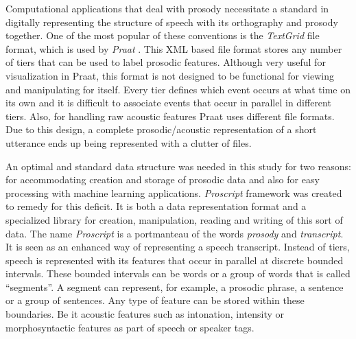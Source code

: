 Computational applications that deal with prosody necessitate a standard in digitally representing the structure of speech with its orthography and prosody together. One of the most popular of these conventions is the \textit{TextGrid} file format, which is used by \textit{Praat} \citep{boersma01}. This XML based file format stores any number of tiers that can be used to label prosodic features. Although very useful for visualization in Praat, this format is not designed to be functional for viewing and manipulating for itself. Every tier defines which event occurs at what time on its own and it is difficult to associate events that occur in parallel in different tiers. Also, for handling raw acoustic features Praat uses different file formats. Due to this design, a complete prosodic/acoustic representation of a short utterance ends up being represented with a clutter of files.

An optimal and standard data structure was needed in this study for two reasons: for accommodating creation and storage of prosodic data and also for easy processing with machine learning applications. \textit{Proscript} framework was created to remedy for this deficit. It is both a data representation format and a specialized library for creation, manipulation, reading and writing of this sort of data. The name \textit{Proscript} is a portmanteau of the words \textit{prosody} and \textit{transcript}. It is seen as an enhanced way of representing a speech transcript. Instead of tiers, speech is represented with its features that occur in parallel at discrete bounded intervals. These bounded intervals can be words or a group of words that is called ``segments''. A segment can represent, for example, a prosodic phrase, a sentence or a group of sentences. Any type of feature can be stored within these boundaries. Be it acoustic features such as intonation, intensity or morphosyntactic features as part of speech or speaker tags. 


